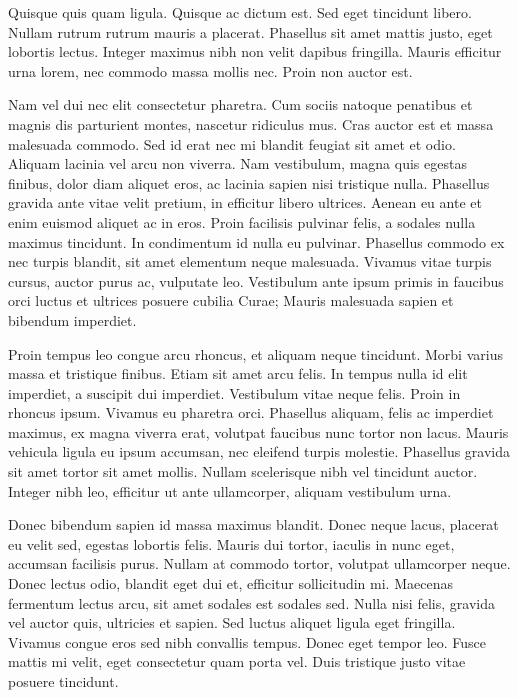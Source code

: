Quisque quis quam ligula. Quisque ac dictum est. Sed eget tincidunt libero. Nullam rutrum rutrum mauris a placerat. Phasellus sit amet mattis justo, eget lobortis lectus. Integer maximus nibh non velit dapibus fringilla. Mauris efficitur urna lorem, nec commodo massa mollis nec. Proin non auctor est.

Nam vel dui nec elit consectetur pharetra. Cum sociis natoque penatibus et magnis dis parturient montes, nascetur ridiculus mus. Cras auctor est et massa malesuada commodo. Sed id erat nec mi blandit feugiat sit amet et odio. Aliquam lacinia vel arcu non viverra. Nam vestibulum, magna quis egestas finibus, dolor diam aliquet eros, ac lacinia sapien nisi tristique nulla. Phasellus gravida ante vitae velit pretium, in efficitur libero ultrices. Aenean eu ante et enim euismod aliquet ac in eros. Proin facilisis pulvinar felis, a sodales nulla maximus tincidunt. In condimentum id nulla eu pulvinar. Phasellus commodo ex nec turpis blandit, sit amet elementum neque malesuada. Vivamus vitae turpis cursus, auctor purus ac, vulputate leo. Vestibulum ante ipsum primis in faucibus orci luctus et ultrices posuere cubilia Curae; Mauris malesuada sapien et bibendum imperdiet.

Proin tempus leo congue arcu rhoncus, et aliquam neque tincidunt. Morbi varius massa et tristique finibus. Etiam sit amet arcu felis. In tempus nulla id elit imperdiet, a suscipit dui imperdiet. Vestibulum vitae neque felis. Proin in rhoncus ipsum. Vivamus eu pharetra orci. Phasellus aliquam, felis ac imperdiet maximus, ex magna viverra erat, volutpat faucibus nunc tortor non lacus. Mauris vehicula ligula eu ipsum accumsan, nec eleifend turpis molestie. Phasellus gravida sit amet tortor sit amet mollis. Nullam scelerisque nibh vel tincidunt auctor. Integer nibh leo, efficitur ut ante ullamcorper, aliquam vestibulum urna.

Donec bibendum sapien id massa maximus blandit. Donec neque lacus, placerat eu velit sed, egestas lobortis felis. Mauris dui tortor, iaculis in nunc eget, accumsan facilisis purus. Nullam at commodo tortor, volutpat ullamcorper neque. Donec lectus odio, blandit eget dui et, efficitur sollicitudin mi. Maecenas fermentum lectus arcu, sit amet sodales est sodales sed. Nulla nisi felis, gravida vel auctor quis, ultricies et sapien. Sed luctus aliquet ligula eget fringilla. Vivamus congue eros sed nibh convallis tempus. Donec eget tempor leo. Fusce mattis mi velit, eget consectetur quam porta vel. Duis tristique justo vitae posuere tincidunt.

